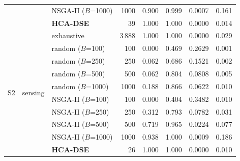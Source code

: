 \documentclass[pdflatex,sn-nature]{sn-jnl}
\theoremstyle{thmstyleone}
\theoremstyle{thmstyletwo}
\theoremstyle{thmstylethree}
\begin{document}
\begin{table}[!htbp]
{\begin{tabular}{lllrrrrr}
 & & NSGA-II ($B$=1000) & 1000 & 0.900 & 0.999 & 0.0007 & 0.161 \\
 & & \textbf{HCA-DSE} & 39 & 1.000 & 1.000 & 0.0000 & 0.014 \\
\midrule
\multirow{10}{*}{S2} & \multirow{10}{*}{sensing} & exhaustive & 3\,888 & 1.000 & 1.000 & 0.0000 & 0.029 \\
 & & random ($B$=100) & 100 & 0.000 & 0.469 & 0.2629 & 0.001 \\
 & & random ($B$=250) & 250 & 0.062 & 0.686 & 0.1521 & 0.002 \\
 & & random ($B$=500) & 500 & 0.062 & 0.804 & 0.0808 & 0.005 \\
 & & random ($B$=1000) & 1000 & 0.188 & 0.866 & 0.0622 & 0.010 \\
 & & NSGA-II ($B$=100) & 100 & 0.000 & 0.404 & 0.3482 & 0.010 \\
 & & NSGA-II ($B$=250) & 250 & 0.312 & 0.793 & 0.0782 & 0.031 \\
 & & NSGA-II ($B$=500) & 500 & 0.719 & 0.965 & 0.0224 & 0.077 \\
 & & NSGA-II ($B$=1000) & 1000 & 0.938 & 1.000 & 0.0009 & 0.186 \\
 & & \textbf{HCA-DSE} & 26 & 1.000 & 1.000 & 0.0000 & 0.010 \\
\midrule
\bottomrule
\end{tabular}}
\end{table}
\end{document}
